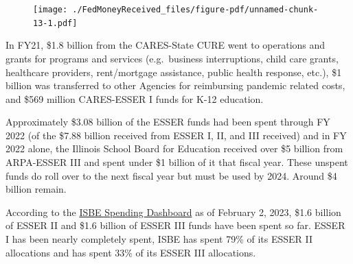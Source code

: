 \documentclass[
  letterpaper,
  DIV=11,
  numbers=noendperiod]{scrreport}
\begin{document}
\begin{figure}[H]

{\centering \texttt{[image: ./FedMoneyReceived\_files/figure-pdf/unnamed-chunk-13-1.pdf]}

}

\end{figure}

In FY21, \$1.8 billion from the CARES-State CURE went to operations and
grants for programs and services (e.g.~business interruptions, child
care grants, healthcare providers, rent/mortgage assistance, public
health response, etc.), \$1 billion was transferred to other Agencies
for reimbursing pandemic related costs, and \$569 million CARES-ESSER I
funds for K-12 education.

Approximately \$3.08 billion of the ESSER funds had been spent through
FY 2022 (of the \$7.88 billion received from ESSER I, II, and III
received) and in FY 2022 alone, the Illinois School Board for Education
received over \$5 billion from ARPA-ESSER III and spent under \$1
billion of it that fiscal year. These unspent funds do roll over to the
next fiscal year but must be used by 2024. Around \$4 billion remain.

According to the
\href{https://www.isbe.net/Pages/ESSER-Spending-Dashboard.aspx}{ISBE
Spending Dashboard} as of February 2, 2023, \$1.6 billion of ESSER II
and \$1.6 billion of ESSER III funds have been spent so far. ESSER I has
been nearly completely spent, ISBE has spent 79\% of its ESSER II
allocations and has spent 33\% of its ESSER III allocations.
\end{document}
